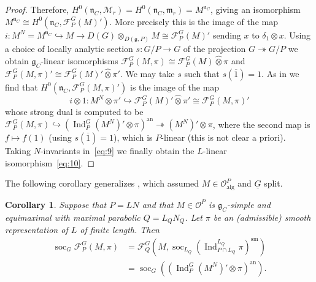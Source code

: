\documentclass[a4paper]{amsart}
\numberwithin{equation}{section}
\newtheorem{cor}[thm]{Corollary}
\theoremstyle{remark}
\theoremstyle{definition}
\DeclareMathOperator{\Ind}{Ind}
\DeclareMathOperator{\soc}{soc}
\newcommand{\sm}{\mathrm{sm}}
\newcommand{\alggrp}[1]{\underline{#1}}
\newcommand{\an}{\mathrm{an}}
\newcommand{\alg}{\mathrm{alg}}
\newcommand{\into}{\hookrightarrow}
\newcommand{\onto}{\twoheadrightarrow}
\begin{document}
\begin{proof}
  Therefore, $H^0(\mathfrak{n}_C, \mathcal{M}_{r}) = H^0(\mathfrak{n}_C, \mathfrak{m}_{r}) = M^{\mathfrak{n}_C}$, giving an isomorphism
  $M^{\mathfrak{n}_C} \cong H^0(\mathfrak{n}_C, \mathcal{F}_P^G(M)')$. More precisely this is the image of the map $i : M^N = M^{\mathfrak{n}_C} \into M \to D(G) \otimes_{D(\mathfrak{g},P)} M \cong \mathcal{F}_P^G(M)'$
  sending $x$ to $\delta_1 \otimes x$. Using a choice of locally analytic section $s : G/P \to G$ of the projection $G \onto G/P$
  we obtain $\mathfrak{g}_C$-linear isomorphisms $\mathcal{F}_P^G(M,\pi) \cong \mathcal{F}_P^G(M) \widehat{\otimes} \pi$ and $\mathcal{F}_P^G(M,\pi)' \cong \mathcal{F}_P^G(M)' \widehat{\otimes} \pi'$.
  We may take $s$ such that $s(\overline{1}) = 1$.
  As in \cite[Theorem 3.5]{orlik-schraen} we find that $H^0(\mathfrak{n}_C, \mathcal{F}_P^G(M,\pi)')$ is the image of the map
  \begin{equation}\label{eq:9}
    i \otimes 1 \colon M^N \otimes \pi' \into \mathcal{F}_P^G(M)' \widehat{\otimes} \pi' \cong \mathcal{F}_P^G(M,\pi)'
  \end{equation}
  whose strong dual is computed to be $\mathcal{F}_P^G(M,\pi) \into (\Ind_P^G (M^N)' \otimes \pi)^{\an} \onto (M^N)' \otimes \pi$,
  where the second map is $f \mapsto f(1)$
  (using $s(\overline{1}) = 1$), which is $P$-linear (this is not clear a
  priori). Taking $N$-invariants in~\eqref{eq:9} we finally obtain the $L$-linear isomorphism~\eqref{eq:10}.
\end{proof}

The following corollary generalizes \cite[Corollary~2.5]{socle1}, which assumed $M \in \mathcal{O}_{\alg}^{P}$ and $\alggrp{G}$ split.

\begin{cor}\label{cor:socle-orlik-strauch}
  Suppose that $P = LN$ and that $M \in \mathcal{O}^{P}$ is $\mathfrak{g}_{C}$-simple and equimaximal with maximal parabolic $Q = L_Q N_Q$. 
  Let $\pi$ be an (admissible) smooth representation of $L$ of finite length.  Then
  \begin{align*}
    \soc_G \mathcal{F}_P^G(M,\pi) &= \mathcal{F}_Q^G(M, \soc_{L_Q} (\Ind_{P\cap L_Q}^{L_Q} \pi)^{\sm}) \\
    &= \soc_G ((\Ind_P^G (M^N)' \otimes \pi)^{\an}).
  \end{align*}
\end{cor}
\end{document}
